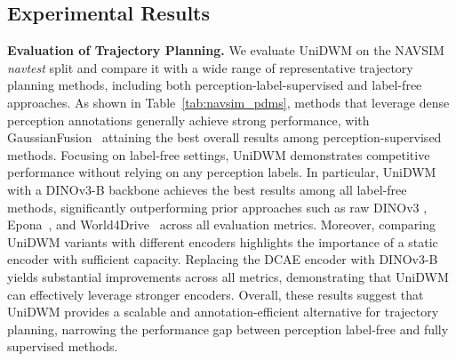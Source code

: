 

\subsection{Experimental Results}


\noindent\textbf{Evaluation of Trajectory Planning.}
We evaluate UniDWM on the NAVSIM \textit{navtest} split and compare it with a wide range of representative trajectory planning methods, including both perception-label-supervised and label-free approaches. As shown in Table~\ref{tab:navsim_pdms}, methods that leverage dense perception annotations generally achieve strong performance, with GaussianFusion~\cite{liu2025gaussianfusion} attaining the best overall results among perception-supervised methods. Focusing on label-free settings, UniDWM demonstrates competitive performance without relying on any perception labels. In particular, UniDWM with a DINOv3-B backbone achieves the best results among all label-free methods, significantly outperforming prior approaches such as raw DINOv3 \cite{dinov3}, Epona~\cite{epona}, and World4Drive~\cite{zheng2025world4drive} across all evaluation metrics. Moreover, comparing UniDWM variants with different encoders highlights the importance of a static encoder with sufficient capacity. Replacing the DCAE encoder with DINOv3-B yields substantial improvements across all metrics, demonstrating that UniDWM can effectively leverage stronger encoders. Overall, these results suggest that UniDWM provides a scalable and annotation-efficient alternative for trajectory planning, narrowing the performance gap between perception label-free and fully supervised methods.



